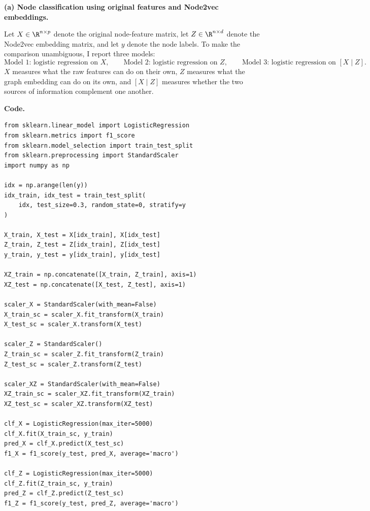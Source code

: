 \documentclass{article}
\begin{document}
\begin{tcolorbox}[colback=white, colframe=black!75, breakable, title=\textbf{Solution to Exercise 1}]
\textbf{(a) Node classification using original features and Node2vec embeddings.}

Let $X \in \R^{n\times p}$ denote the original node-feature matrix, let $Z \in \R^{n\times d}$ denote the Node2vec embedding matrix, and let $y$ denote the node labels. To make the comparison unambiguous, I report three models:
\[
\text{Model 1: logistic regression on } X,
\qquad
\text{Model 2: logistic regression on } Z,
\qquad
\text{Model 3: logistic regression on } [X\mid Z].
\]
$X$ measures what the raw features can do on their own, $Z$ measures what the graph embedding can do on its own, and $[X\mid Z]$ measures whether the two sources of information complement one another.

\medskip
\textbf{Code.}
\begin{lstlisting}[style=python2]
from sklearn.linear_model import LogisticRegression
from sklearn.metrics import f1_score
from sklearn.model_selection import train_test_split
from sklearn.preprocessing import StandardScaler
import numpy as np

idx = np.arange(len(y))
idx_train, idx_test = train_test_split(
    idx, test_size=0.3, random_state=0, stratify=y
)

X_train, X_test = X[idx_train], X[idx_test]
Z_train, Z_test = Z[idx_train], Z[idx_test]
y_train, y_test = y[idx_train], y[idx_test]

XZ_train = np.concatenate([X_train, Z_train], axis=1)
XZ_test = np.concatenate([X_test, Z_test], axis=1)

scaler_X = StandardScaler(with_mean=False)
X_train_sc = scaler_X.fit_transform(X_train)
X_test_sc = scaler_X.transform(X_test)

scaler_Z = StandardScaler()
Z_train_sc = scaler_Z.fit_transform(Z_train)
Z_test_sc = scaler_Z.transform(Z_test)

scaler_XZ = StandardScaler(with_mean=False)
XZ_train_sc = scaler_XZ.fit_transform(XZ_train)
XZ_test_sc = scaler_XZ.transform(XZ_test)

clf_X = LogisticRegression(max_iter=5000)
clf_X.fit(X_train_sc, y_train)
pred_X = clf_X.predict(X_test_sc)
f1_X = f1_score(y_test, pred_X, average='macro')

clf_Z = LogisticRegression(max_iter=5000)
clf_Z.fit(Z_train_sc, y_train)
pred_Z = clf_Z.predict(Z_test_sc)
f1_Z = f1_score(y_test, pred_Z, average='macro')


\end{lstlisting}
\end{tcolorbox}
\end{document}
